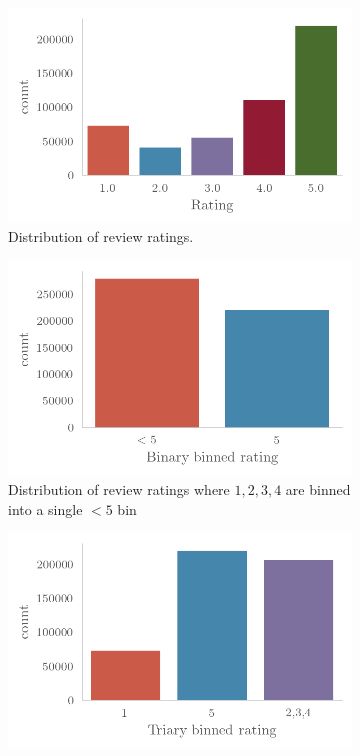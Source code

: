 \begin{figure}[H]
    \begin{subfigure}
        \centering
        \includegraphics{Figures/rating.png}
        \caption{Distribution of review ratings.}
    \end{subfigure}
    \begin{subfigure}
        \centering
        \includegraphics{Figures/rating_bin.png}
        \caption{Distribution of review ratings where $1, 2,3 ,4$ are binned
        into a single $<5$ bin}
    \end{subfigure}
    \begin{subfigure}
        \centering
        \includegraphics{Figures/rating_tri.png}

\end{subfigure}
\end{figure}
